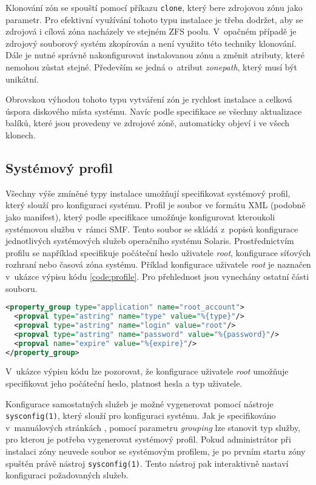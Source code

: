 Klonování zón se spouští pomocí příkazu \verb|clone|, který bere zdrojovou zónu jako parametr. Pro efektivní
využívání tohoto typu instalace je třeba dodržet, aby se zdrojová i cílová zóna nacházely ve stejném ZFS poolu.
V~opačném případě je zdrojový souborový systém zkopírován a není využito této techniky klonování. Dále je nutné
správně nakonfigurovat instalovanou zónu a změnit atributy, které nemohou zůstat stejné. Především se jedná o~atribut
\textit{zonepath}, který musí být unikátní.

Obrovskou výhodou tohoto typu vytváření zón je rychlost instalace a celková úspora diskového místa systému. Navíc podle specifikace
\cite{oracle:solaris:zones:clonning} se všechny aktualizace balíků, které jsou provedeny ve zdrojové zóně, automaticky objeví i ve
všech klonech.
\subsection{Systémový profil}
\label{chapter:zones:instalation:profile}
Všechny výše zmíněné typy instalace umožňují specifikovat systémový profil, který slouží pro konfiguraci systému. Profil je soubor
ve formátu XML (podobně jako manifest), který podle specifikace \cite{oracle:solaris:zones:profile} umožňuje konfigurovat
kteroukoli systémovou službu v~rámci SMF. Tento soubor se skládá z~popisů konfigurace jednotlivých systémových služeb
operačního systému Solaris. Prostřednictvím profilu se například specifikuje počáteční heslo uživatele \textit{root}, konfigurace 
síťových rozhraní nebo časová zóna systému. Příklad konfigurace uživatele \textit{root} je naznačen v~ukázce výpisu kódu \ref{code:profile}.
Pro přehlednost jsou vynechány ostatní části souboru.
\begin{lstlisting}[language={XML}, caption={Konfigurace uživatele root}, float, label={code:profile}]
<property_group type="application" name="root_account">
  <propval type="astring" name="type" value="%{type}"/>
  <propval type="astring" name="login" value="root"/>
  <propval type="astring" name="password" value="%{password}"/>
  <propval name="expire" value="%{expire}"/>
</property_group>
\end{lstlisting}
V~ukázce výpisu kódu lze pozorovat, že konfigurace uživatele \textit{root} umožňuje specifikovat jeho počáteční heslo, platnost
hesla a typ uživatele.

Konfigurace samostatných služeb je možné vygenerovat pomocí nástroje \verb|sysconfig(1)|, který slouží pro konfiguraci systému.
Jak je specifikováno v~manuálových stránkách \cite{oracle:manpages:sysconfig}, pomocí parametru \textit{grouping} lze stanovit typ
služby, pro kterou je potřeba vygenerovat systémový profil. Pokud administrátor při instalaci zóny neuvede soubor se systémovým
profilem, je po prvním startu zóny spuštěn právě nástroj \verb|sysconfig(1)|. Tento nástroj pak interaktivně nastaví konfiguraci
požadovaných služeb.
